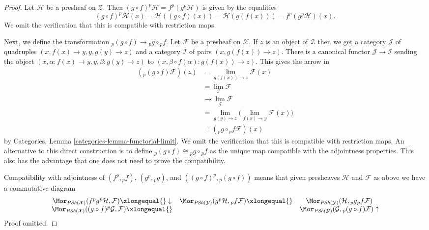 \begin{proof}
Let $\mathcal{H}$ be a presheaf on $\mathcal{Z}$. Then
$(g \circ f)^p\mathcal{H} = f^p (g^p\mathcal{H})$ is given
by the equalities
$$
(g \circ f)^p\mathcal{H}(x) = \mathcal{H}((g \circ f)(x))
= \mathcal{H}(g(f(x))) = f^p (g^p\mathcal{H})(x).
$$
We omit the verification that this is compatible with restriction maps.

\medskip\noindent
Next, we define the transformation ${}_p(g \circ f) \to {}_pg \circ {}_pf$.
Let $\mathcal{F}$ be a presheaf on $\mathcal{X}$.
If $z$ is an object of $\mathcal{Z}$ then we get a
category $\mathcal{J}$ of quadruples
$(x, f(x) \to y, y, g(y) \to z)$ and a category $\mathcal{I}$
of pairs $(x, g(f(x)) \to z)$. There is a canonical functor
$\mathcal{J} \to \mathcal{I}$ sending the object
$(x, \alpha : f(x) \to y, y, \beta : g(y) \to z)$ to
$(x, \beta \circ f(\alpha) : g(f(x)) \to z)$. This gives the arrow in
\begin{align*}
({}_p(g \circ f)\mathcal{F})(z) & =
\lim_{g(f(x)) \to z} \mathcal{F}(x) \\
& = \lim_\mathcal{I} \mathcal{F} \\
& \to \lim_\mathcal{J} \mathcal{F} \\
& = \lim_{g(y) \to z}
\Big(\lim_{f(x) \to y} \mathcal{F}(x)\Big) \\
& =
({}_pg \circ {}_pf\mathcal{F})(x)
\end{align*}
by
Categories, Lemma \ref{categories-lemma-functorial-limit}.
We omit the verification that this is compatible with restriction maps.
An alternative to this direct construction is to define
${}_p(g \circ f) \cong {}_pg \circ {}_pf$
as the unique map compatible with the adjointness properties. This also
has the advantage that one does not need to prove the compatibility.

\medskip\noindent
Compatibility with adjointness of $(f^p, {}_pf)$, $(g^p, {}_pg)$, and
$((g \circ f)^p, {}_p(g \circ f))$ means that given presheaves
$\mathcal{H}$ and $\mathcal{F}$ as above we have a commutative diagram
$$
\begin{array}{ccc}\Mor_{\textit{PSh}(\mathcal{X})}(f^pg^p\mathcal{H}, \mathcal{F})
\xlongequal{}\downarrow & \Mor_{\textit{PSh}(\mathcal{Y})}(g^p\mathcal{H}, {}_pf\mathcal{F})
\xlongequal{} & \Mor_{\textit{PSh}(\mathcal{Y})}(\mathcal{H}, {}_pg{}_pf\mathcal{F}) \\ \Mor_{\textit{PSh}(\mathcal{X})}((g \circ f)^p\mathcal{G}, \mathcal{F})
\xlongequal{} &  & \Mor_{\textit{PSh}(\mathcal{Y})}(\mathcal{G}, {}_p(g \circ f)\mathcal{F})
\uparrow\end{array}
$$
Proof omitted.
\end{proof}

